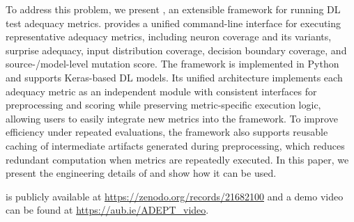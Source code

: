 To address this problem, we present \tool, an extensible framework for running DL test adequacy metrics.
\tool provides a unified command-line interface for executing representative adequacy metrics, including neuron coverage and its variants, surprise adequacy, input distribution coverage, decision boundary coverage, and source-/model-level mutation score.
The framework is implemented in Python and supports Keras-based DL models.
Its unified architecture implements each adequacy metric as an independent module with consistent interfaces for preprocessing and scoring while preserving metric-specific execution logic, allowing users to easily integrate new metrics into the framework.
To improve efficiency under repeated evaluations, the framework also supports reusable caching of intermediate artifacts generated during preprocessing, which reduces redundant computation when metrics are repeatedly executed.
In this paper, we present the engineering details of \tool and show how it can be used.

\tool is publicly available at \url{https://zenodo.org/records/21682100} and a demo video can be found at \url{https://aub.ie/ADEPT_video}.






